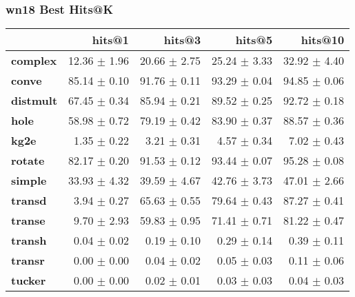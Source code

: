 \documentclass{article}
\begin{document}
\subsubsection{wn18 Best Hits@K}
    \begin{center}
    \begin{tabular}{lrrrr}
\toprule
{} &        hits@1 &        hits@3 &        hits@5 &       hits@10 \\
\midrule
\textbf{complex } &  12.36 $\pm$ 1.96 &  20.66 $\pm$ 2.75 &  25.24 $\pm$ 3.33 &  32.92 $\pm$ 4.40 \\
\textbf{conve   } &  85.14 $\pm$ 0.10 &  91.76 $\pm$ 0.11 &  93.29 $\pm$ 0.04 &  94.85 $\pm$ 0.06 \\
\textbf{distmult} &  67.45 $\pm$ 0.34 &  85.94 $\pm$ 0.21 &  89.52 $\pm$ 0.25 &  92.72 $\pm$ 0.18 \\
\textbf{hole    } &  58.98 $\pm$ 0.72 &  79.19 $\pm$ 0.42 &  83.90 $\pm$ 0.37 &  88.57 $\pm$ 0.36 \\
\textbf{kg2e    } &   1.35 $\pm$ 0.22 &   3.21 $\pm$ 0.31 &   4.57 $\pm$ 0.34 &   7.02 $\pm$ 0.43 \\
\textbf{rotate  } &  82.17 $\pm$ 0.20 &  91.53 $\pm$ 0.12 &  93.44 $\pm$ 0.07 &  95.28 $\pm$ 0.08 \\
\textbf{simple  } &  33.93 $\pm$ 4.32 &  39.59 $\pm$ 4.67 &  42.76 $\pm$ 3.73 &  47.01 $\pm$ 2.66 \\
\textbf{transd  } &   3.94 $\pm$ 0.27 &  65.63 $\pm$ 0.55 &  79.64 $\pm$ 0.43 &  87.27 $\pm$ 0.41 \\
\textbf{transe  } &   9.70 $\pm$ 2.93 &  59.83 $\pm$ 0.95 &  71.41 $\pm$ 0.71 &  81.22 $\pm$ 0.47 \\
\textbf{transh  } &   0.04 $\pm$ 0.02 &   0.19 $\pm$ 0.10 &   0.29 $\pm$ 0.14 &   0.39 $\pm$ 0.11 \\
\textbf{transr  } &   0.00 $\pm$ 0.00 &   0.04 $\pm$ 0.02 &   0.05 $\pm$ 0.03 &   0.11 $\pm$ 0.06 \\
\textbf{tucker  } &   0.00 $\pm$ 0.00 &   0.02 $\pm$ 0.01 &   0.03 $\pm$ 0.03 &   0.04 $\pm$ 0.03 \\
\bottomrule
\end{tabular}

    \end{center}
\end{document}
